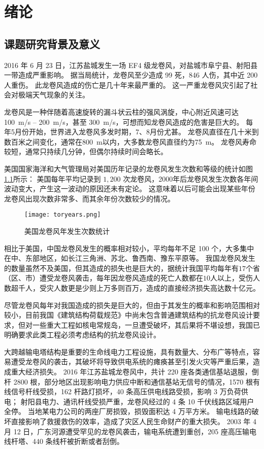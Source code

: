 \graphicspath{{figures/intro/}}

\chapter{绪论}

\section{课题研究背景及意义}

2016 年 6 月 23 日，江苏盐城发生一场 EF4 级龙卷风，对盐城市阜宁县、射阳县一带造成严重影响。
据当局统计，龙卷风至少造成 99 死，846 人伤，其中近 200 人重伤。
此龙卷风造成的伤亡是几十年来最严重的\cite{wiki2016yancheng}。
这一严重龙卷风灾引起了社会对极端天气现象的关注。

龙卷风是一种伴随着高速旋转的漏斗状云柱的强风涡旋，中心附近风速可达 \SI{100}{m/s} -- \SI{200}{m/s}，甚至 \SI{300}{m/s}，可想而知龙卷风造成的危害是巨大的。
每年5月份开始，世界进入龙卷风多发时期，7、8月份尤甚。
龙卷风直径在几十米到数百米之间变化，通常在\SI{800}{m}以内，大多数龙卷风直径约为\SI{75}{m}。
龙卷风寿命较短，通常只持续几分钟，但偶尔持续时间会略长。

美国国家海洋和大气管理局对美国历年记录的龙卷风发生次数和等级的统计如图\ref{fig:tornado-years}所示\cite{noaa2017tornado}：
美国每年平均记录到 $1,200$ 次龙卷风，2000年后龙卷风发生次数各年间波动变大，产生这一波动的原因还未有定论。
这意味着以后可能会出现某些年份龙卷风出现次数非常多、而其余年份次数较少的情况。

\begin{figure}[!htbp]
    \centering
    \texttt{[image: toryears.png]}
    \caption{美国龙卷风年发生次数统计}
    \label{fig:tornado-years}
\end{figure}

相比于美国，中国龙卷风发生的概率相对较小，平均每年不足 100 个，大多集中在中、东部地区，如长江三角洲、苏北、鲁西南、豫东平原等。
我国龙卷风发生的数量虽然不及美国，但其造成的损失也是巨大的，据统计我国平均每年有$17$个省（区、市）遭受龙卷风袭击，每年因龙卷风造成的死亡人数都在$10$人以上，受伤人数超千人，受灾人数更是少则上万多则百万，造成的直接经济损失高达数十亿元\cite{liu2007chinese}。

尽管龙卷风每年对我国造成的损失是巨大的，但由于其发生的概率和影响范围相对较小，目前我国《建筑结构荷载规范》中尚未包含普通建筑结构的抗龙卷风设计要求，但对一些重大工程如核电常规岛，一旦遭受破坏，其后果将不堪设想，我国已明确要求此类工程必须考虑结构的抗龙卷风设计。

大跨越输电塔结构是重要的生命线电力工程设施，具有数量大、分布广等特点，容易遭受龙卷风的袭击，其破坏将导致供电系统的瘫痪甚至引发火灾等严重后果，造成重大经济损失。
2016 年江苏盐城龙卷风中，共计 220 座各类通信基站退服，倒杆 2800 根，部分地区出现影响电力供应中断和通信基站无信号的情况，1570 根有线信号杆线受损，162 杆路灯损坏，40 条高压供电线路受损，影响 3 万负荷供电；
射阳县电力、通讯杆线受损严重，龙卷风经过的 4 条 10 千伏线路区域用户全停。
当地某电力公司的两座厂房损毁，损毁面积达 4 万平方米\cite{thepaper2016yancheng}。
输电线路的破坏直接影响了救援救伤的效率，造成了灾区人民生命财产的重大损失。
2003 年 4 月 12 日，广东河源遭受罕见的龙卷风袭击，输电系统遭到重创，205 座高压输电线杆塔、440 条线杆被折断或者刮倒\cite{zhang2006shudianxian}。


